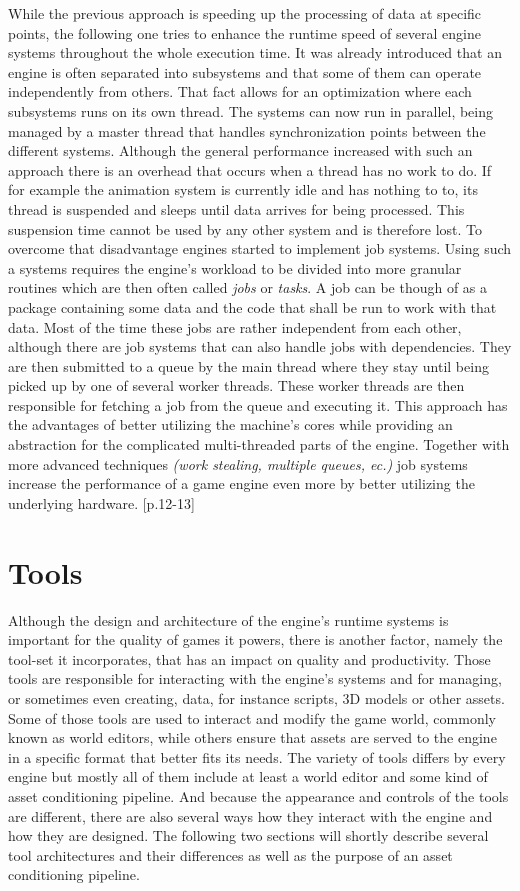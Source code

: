 While the previous approach is speeding up the processing of data at specific points, the following one tries to enhance the runtime speed of several engine systems throughout the whole execution time. It was already introduced that an engine is often separated into subsystems and that some of them can operate independently from others. That fact allows for an optimization where each subsystems runs on its own thread. The systems can now run in parallel, being managed by a master thread that handles synchronization points between the different systems. Although the general performance increased with such an approach there is an overhead that occurs when a thread has no work to do. If for example the animation system is currently idle and has nothing to to, its thread is suspended and sleeps until data arrives for being processed. This suspension time cannot be used by any other system and is therefore lost.
To overcome that disadvantage engines started to implement job systems. Using such a systems requires the engine's workload to be divided into more granular routines which are then often called \textit{jobs} or \textit{tasks}. A job can be though of as a package containing some data and the code that shall be run to work with that data. Most of the time these jobs are rather independent from each other, although there are job systems that can also handle jobs with dependencies. They are then submitted to a queue by the main thread where they stay until being picked up by one of several worker threads. These worker threads are then responsible for fetching a job from the queue and executing it. This approach has the advantages of better utilizing the machine's cores while providing an abstraction for the complicated multi-threaded parts of the engine. Together with more advanced techniques \textit{(work stealing, multiple queues, ec.)} job systems increase the performance of a game engine even more by better utilizing the underlying hardware. \cite{Portisch17}[p.12-13]

\section{Tools}

Although the design and architecture of the engine's runtime systems is important for the quality of games it powers, there is another factor, namely the tool-set it incorporates, that has an impact on quality and productivity. Those tools are responsible for interacting with the engine's systems and for managing, or sometimes even creating, data, for instance scripts, 3D models or other assets. Some of those tools are used to interact and modify the game world, commonly known as world editors, while others ensure that assets are served to the engine in a specific format that better fits its needs. The variety of tools differs by every engine but mostly all of them include at least a world editor and some kind of asset conditioning pipeline. And because the appearance and controls of the tools are different, there are also several ways how they interact with the engine and how they are designed. The following two sections will shortly describe several tool architectures  and their differences as well as the purpose of an asset conditioning pipeline.


